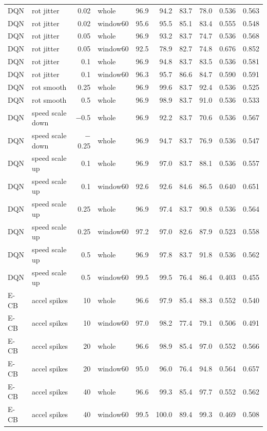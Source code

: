 \begin{longtable}{llrlrrrrrr}
DQN & rot jitter & 0.02 & whole & 96.9 & 94.2 & 83.7 & 78.0 & 0.536 & 0.563 \\
DQN & rot jitter & 0.02 & window60 & 95.6 & 95.5 & 85.1 & 83.4 & 0.555 & 0.548 \\
DQN & rot jitter & 0.05 & whole & 96.9 & 93.2 & 83.7 & 74.7 & 0.536 & 0.568 \\
DQN & rot jitter & 0.05 & window60 & 92.5 & 78.9 & 82.7 & 74.8 & 0.676 & 0.852 \\
DQN & rot jitter & 0.1 & whole & 96.9 & 94.8 & 83.7 & 83.5 & 0.536 & 0.581 \\
DQN & rot jitter & 0.1 & window60 & 96.3 & 95.7 & 86.6 & 84.7 & 0.590 & 0.591 \\
DQN & rot smooth & 0.25 & whole & 96.9 & 99.6 & 83.7 & 92.4 & 0.536 & 0.525 \\
DQN & rot smooth & 0.5 & whole & 96.9 & 98.9 & 83.7 & 91.0 & 0.536 & 0.533 \\
DQN & speed scale down & $-$0.5 & whole & 96.9 & 92.2 & 83.7 & 70.6 & 0.536 & 0.567 \\
DQN & speed scale down & $-$0.25 & whole & 96.9 & 94.7 & 83.7 & 76.9 & 0.536 & 0.547 \\
DQN & speed scale up & 0.1 & whole & 96.9 & 97.0 & 83.7 & 88.1 & 0.536 & 0.557 \\
DQN & speed scale up & 0.1 & window60 & 92.6 & 92.6 & 84.6 & 86.5 & 0.640 & 0.651 \\
DQN & speed scale up & 0.25 & whole & 96.9 & 97.4 & 83.7 & 90.8 & 0.536 & 0.564 \\
DQN & speed scale up & 0.25 & window60 & 97.2 & 97.0 & 82.6 & 87.9 & 0.523 & 0.558 \\
DQN & speed scale up & 0.5 & whole & 96.9 & 97.8 & 83.7 & 91.8 & 0.536 & 0.562 \\
DQN & speed scale up & 0.5 & window60 & 99.5 & 99.5 & 76.4 & 86.4 & 0.403 & 0.455 \\
E-CB & accel spikes & 10 & whole & 96.6 & 97.9 & 85.4 & 88.3 & 0.552 & 0.540 \\
E-CB & accel spikes & 10 & window60 & 97.0 & 98.2 & 77.4 & 79.1 & 0.506 & 0.491 \\
E-CB & accel spikes & 20 & whole & 96.6 & 98.9 & 85.4 & 97.0 & 0.552 & 0.566 \\
E-CB & accel spikes & 20 & window60 & 95.0 & 96.0 & 76.4 & 94.8 & 0.564 & 0.657 \\
E-CB & accel spikes & 40 & whole & 96.6 & 99.3 & 85.4 & 97.7 & 0.552 & 0.562 \\
E-CB & accel spikes & 40 & window60 & 99.5 & 100.0 & 89.4 & 99.3 & 0.469 & 0.508 \\

\end{longtable}
